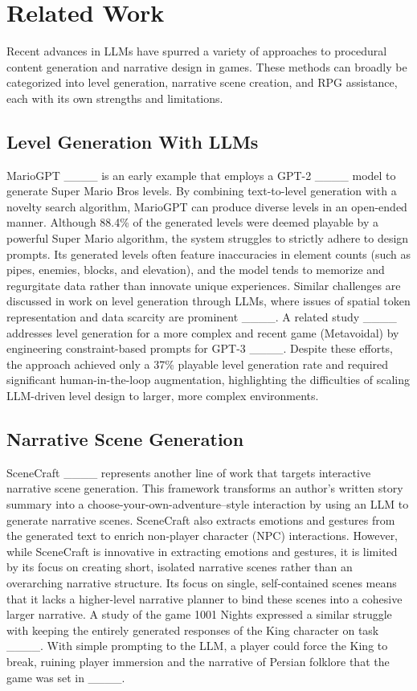 \section{Related Work}
Recent advances in LLMs have spurred a variety of approaches to procedural content generation and narrative design in games. These methods can broadly be categorized into level generation, narrative scene creation, and RPG assistance, each with its own strengths and limitations.

\subsection{Level Generation With LLMs}
MarioGPT ____ is an early example that employs a GPT-2 ____ model to generate Super Mario Bros levels. By combining text-to-level generation with a novelty search algorithm, MarioGPT can produce diverse levels in an open-ended manner. Although 88.4\% of the generated levels were deemed playable by a powerful Super Mario algorithm, the system struggles to strictly adhere to design prompts. Its generated levels often feature inaccuracies in element counts (such as pipes, enemies, blocks, and elevation), and the model tends to memorize and regurgitate data rather than innovate unique experiences. Similar challenges are discussed in work on level generation through LLMs, where issues of spatial token representation and data scarcity are prominent ____. A related study ____ addresses level generation for a more complex and recent game (Metavoidal) by engineering constraint-based prompts for GPT-3 ____. Despite these efforts, the approach achieved only a 37\% playable level generation rate and required significant human-in-the-loop augmentation, highlighting the difficulties of scaling LLM-driven level design to larger, more complex environments.

\subsection{Narrative Scene Generation}
SceneCraft ____ represents another line of work that targets interactive narrative scene generation. This framework transforms an author's written story summary into a choose-your-own-adventure–style interaction by using an LLM to generate narrative scenes. SceneCraft also extracts emotions and gestures from the generated text to enrich non-player character (NPC) interactions. However, while SceneCraft is innovative in extracting emotions and gestures, it is limited by its focus on creating short, isolated narrative scenes rather than an overarching narrative structure. Its focus on single, self-contained scenes means that it lacks a higher-level narrative planner to bind these scenes into a cohesive larger narrative. A study of the game 1001 Nights expressed a similar struggle with keeping the entirely generated responses of the King character on task ____. With simple prompting to the LLM, a player could force the King to break, ruining player immersion and the narrative of Persian folklore that the game was set in ____.   

